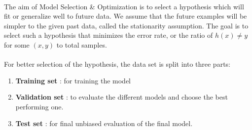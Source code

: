 \documentclass{article}
\begin{document}
















\paragraph{}
  The aim of Model Selection \& Optimization is to select a hypothesis which will fit or generalize well to future data. 
  We assume that the future examples will be simpler to the given past data, called the stationarity assumption. 
  The goal is to select such a hypothesis that minimizes the error rate, or the ratio of $h(x) \neq y$ for some $(x,y)$ to total samples.

\paragraph{}
  For better selection of the hypothesis, the data set is split into three parts:
  \begin{enumerate}
    \item \textbf{Training set} : for training the model
    \item \textbf{Validation set} : to evaluate the different models and choose the best performing one.
    \item \textbf{Test set} : for final unbiased evaluation of the final model.
  \end{enumerate}
\end{document}
